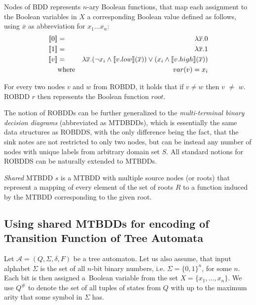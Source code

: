Nodes of BDD represents $n$-ary Boolean functions, that map each assignment to the Boolean variables in $X$ a corresponding Boolean value defined as follows, using $\overline{x}$ as abbreviation for $x_1\ldots x_n$:
\begin{eqnarray*}
 \text{\textlbrackdbl} 0\text{\textrbrackdbl} & = & \lambda\overline{x}.0\\
 \text{\textlbrackdbl} 1\text{\textrbrackdbl} & = & \lambda\overline{x}.1\\
 \text{\textlbrackdbl} v\text{\textrbrackdbl} & = & \lambda\overline{x}.(\neg x_i \wedge \text{\textlbrackdbl} v.low\text{\textrbrackdbl}(\overline{x})) \vee (x_i \wedge \text{\textlbrackdbl} v.high\text{\textrbrackdbl}(\overline{x}))\\
       & \text{where} & var(v) = x_i
\end{eqnarray*}

For every two nodes $v$ and $w$ from ROBDD, it holds that if $v \neq w$ then \textlbrackdbl $v$ \textrbrackdbl$ \neq$ \textlbrackdbl $w$\textrbrackdbl. ROBDD $r$ then represents the Boolean function \textlbrackdbl $root$\textrbrackdbl.

The notion of ROBDDs can be further generalized to the \emph{multi-terminal binary decision diagrams} (abbreviated as MTDBDDs), which is essentially the same data structures as ROBDDS, with the only difference being the fact, that the sink notes are not restricted to only two nodes, but can be instead any number of nodes with unique labels from arbitrary domain set $S$. All standard notions for ROBDDS can be naturally extended to MTBDDs.

\emph{Shared} MTBDD $s$ is a MTBDD with multiple source nodes (or roots) that represent a mapping of every element of the set of roots $R$ to a function induced by the MTBDD corresponding to the given root.

\subsection[Usage of MTBDDs with TA]{Using shared MTBDDs for encoding of Transition Function of Tree Automata}
Let $\mathcal{A} = (Q, \Sigma, \delta, F)$ be a tree automaton. Let us also assume, that input alphabet $\Sigma$ is the set of all $n$-bit binary numbers, i.e. $\Sigma = \{0,1\}^n$, for some $n$. Each bit is then assigned a~Boolean variable from the set $X = \{x_1,\ldots,x_n\}$. We use $Q^\#$ to denote the set of all tuples of states from $Q$ with up to the maximum arity that some symbol in $\Sigma$ has.

